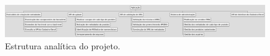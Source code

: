 
\begin{figure}[H] %
    \centering
    \includegraphics[width=1\linewidth, height=0.15\textheight]{img/EAP do projeto.png}
    \caption{Estrutura analítica do projeto.}
    \label{fig:eap} %
\end{figure}

